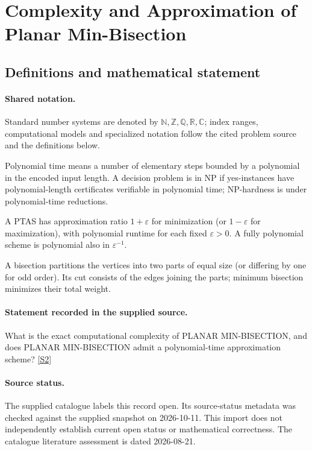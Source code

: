 \documentclass[11pt]{article}
\newcommand{\sref}[2]{\hyperlink{source:#1:#2}{[S#2]}}
\begin{document}
\section{Complexity and Approximation of Planar Min-Bisection}\label{statement}

\subsection{Definitions and mathematical statement}

\paragraph{Shared notation.}Standard number systems are denoted by $\mathbb N,\mathbb Z,\mathbb Q,\mathbb R,\mathbb C$; index ranges, computational models and specialized notation follow the cited problem source and the definitions below.


Polynomial time means a number of elementary steps bounded by a polynomial in the encoded input length. A decision problem is in $\mathrm{NP}$ if yes-instances have polynomial-length certificates verifiable in polynomial time; NP-hardness is under polynomial-time reductions.

A PTAS has approximation ratio $1+\varepsilon$ for minimization (or $1-\varepsilon$ for maximization), with polynomial runtime for each fixed $\varepsilon>0$. A fully polynomial scheme is polynomial also in $\varepsilon^{-1}$.

A bisection partitions the vertices into two parts of equal size (or differing by one for odd order). Its cut consists of the edges joining the parts; minimum bisection minimizes their total weight.
\paragraph{Statement recorded in the supplied source.}
What is the exact computational complexity of PLANAR MIN-BISECTION, and does PLANAR MIN-BISECTION admit a polynomial-time approximation scheme? \sref{statement}{2}
\paragraph{Source status.}
The supplied catalogue labels this record open. Its source-status metadata was checked against the supplied snapshot on 2026-10-11. This import does not independently establish current open status or mathematical correctness. The catalogue literature assessment is dated 2026-08-21.
\end{document}

